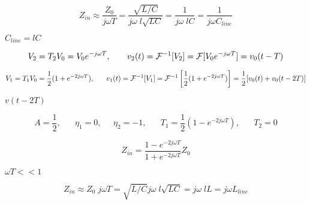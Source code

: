 {\newpage\clearpage
{}%
\begin{displaymath} Z_{in}\approx \frac{Z_0}{j\omega T}=\frac{\sqrt{L/C}}{j\omega\;l\sqrt{LC}}
  =\frac{1}{j\omega\;lC}=\frac{1}{j\omega C_{line}}	\end{displaymath}%
\lthtmldisplayZ
\lthtmlcheckvsize\clearpage}

{\newpage\clearpage
{}%
$C_{line}=lC$%
\lthtmlinlinemathZ
\lthtmlcheckvsize\clearpage}

{\newpage\clearpage
{}%
\begin{displaymath}	V_2=T_2V_0=V_0 e^{-j\omega T},\;\;\;\;\;\;\;
  v_2(t)={\cal F}^{-1}[V_2]={\cal F}[V_0 e^{-j\omega T}]=v_0(t-T)	\end{displaymath}%
\lthtmldisplayZ
\lthtmlcheckvsize\clearpage}

{\newpage\clearpage
{}%
\begin{displaymath}	V_1=T_1V_0=\frac{1}{2}(1+e^{-2j\omega T}),\;\;\;\;\;\;
  v_1(t)={\cal F}^{-1}[V_1]={\cal F}^{-1}\left[\frac{1}{2}(1+e^{-2j\omega T})\right]
  =\frac{1}{2}[v_0(t)+v_0(t-2T)]	\end{displaymath}%
\lthtmldisplayZ
\lthtmlcheckvsize\clearpage}

{\newpage\clearpage
{}%
$v(t-2T)$%
\lthtmlinlinemathZ
\lthtmlcheckvsize\clearpage}

{\newpage\clearpage
{}%
\begin{displaymath}	A=\frac{1}{2},\;\;\;\;\;\;\eta_1=0,\;\;\;\;\;\eta_2=-1,
  \;\;\;\;\;\; T_1=\frac{1}{2}(1-e^{-2j\omega T}),\;\;\;\;\;\;T_2=0 \end{displaymath}%
\lthtmldisplayZ
\lthtmlcheckvsize\clearpage}

{\newpage\clearpage
{}%
\begin{displaymath} Z_{in}=\frac{1-e^{-2j\omega T}}{1+e^{-2j\omega T}}Z_0 \end{displaymath}%
\lthtmldisplayZ
\lthtmlcheckvsize\clearpage}

{\newpage\clearpage
{}%
$\omega T << 1$%
\lthtmlinlinemathZ
\lthtmlcheckvsize\clearpage}

{\newpage\clearpage
{}%
\begin{displaymath} Z_{in}\approx Z_0 \;j\omega T=\sqrt{L/C}j\omega\;l\sqrt{LC}
  =j\omega\;lL=j\omega L_{line}	\end{displaymath}%
\lthtmldisplayZ
\lthtmlcheckvsize\clearpage}

